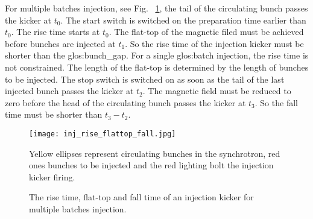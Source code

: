 For multiple batches injection, see Fig. ~\ref{inj_rise_flattop_fall}, the tail of the circulating bunch passes the kicker at $t_0$. The start switch is switched on the preparation time earlier than $t_0$. The rise time starts at $t_0$.  The flat-top of the magnetic filed must be achieved before bunches are injected at $t_1$. So the rise time of the injection kicker must be shorter than the \gls{glos:bunch_gap}. For a single \gls{glos:batch} injection, the rise time is not constrained. The length of the flat-top is determined by the length of bunches to be injected. The stop switch is switched on as soon as the tail of the last injected bunch passes the kicker at $t_2$. The magnetic field must be reduced to zero before the head of the circulating bunch passes the kicker at $t_3$. So the fall time must be shorter than $t_3-t_2$.

\begin{figure}[!htb]
   \centering   
   \texttt{[image: inj\_rise\_flattop\_fall.jpg]}
   \caption{The rise time, flat-top and fall time of an injection kicker for multiple batches injection.}{Yellow ellipses represent circulating bunches in the synchrotron, red ones bunches to be injected and the red lighting bolt the injection kicker firing.}
   \label{inj_rise_flattop_fall}
\end{figure}

%


%
%


